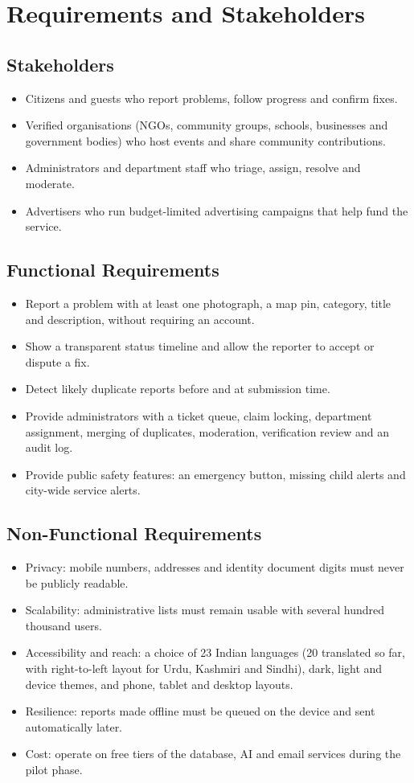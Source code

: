 \documentclass[conference]{IEEEtran}
\begin{document}
\section{Requirements and Stakeholders}
\subsection{Stakeholders}
\begin{itemize}
\item Citizens and guests who report problems, follow progress and confirm fixes.
\item Verified organisations (NGOs, community groups, schools, businesses and government bodies) who host events and share community contributions.
\item Administrators and department staff who triage, assign, resolve and moderate.
\item Advertisers who run budget-limited advertising campaigns that help fund the service.
\end{itemize}
\subsection{Functional Requirements}
\begin{itemize}
\item Report a problem with at least one photograph, a map pin, category, title and description, without requiring an account.
\item Show a transparent status timeline and allow the reporter to accept or dispute a fix.
\item Detect likely duplicate reports before and at submission time.
\item Provide administrators with a ticket queue, claim locking, department assignment, merging of duplicates, moderation, verification review and an audit log.
\item Provide public safety features: an emergency button, missing child alerts and city-wide service alerts.
\end{itemize}
\subsection{Non-Functional Requirements}
\begin{itemize}
\item Privacy: mobile numbers, addresses and identity document digits must never be publicly readable.
\item Scalability: administrative lists must remain usable with several hundred thousand users.
\item Accessibility and reach: a choice of 23 Indian languages (20 translated so far, with right-to-left layout for Urdu, Kashmiri and Sindhi), dark, light and device themes, and phone, tablet and desktop layouts.
\item Resilience: reports made offline must be queued on the device and sent automatically later.
\item Cost: operate on free tiers of the database, AI and email services during the pilot phase.
\end{itemize}
\end{document}
